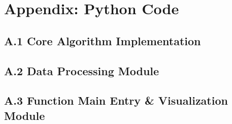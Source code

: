\documentclass[openany,12pt,UTF8]{article}
\begin{document}
\section*{Appendix: Python Code}

\subsection*{A.1 Core Algorithm Implementation}



\subsection*{A.2 Data Processing Module}



\subsection*{A.3 Function Main Entry \& Visualization Module}


\end{document}
